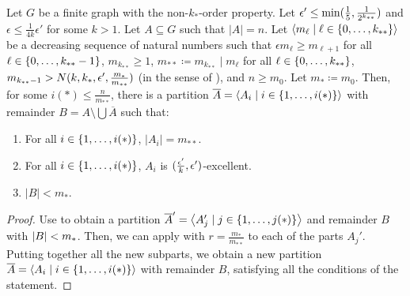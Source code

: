     \begin{lemma}[Claim 5.14.1a] \label{lem:existance_of_excellent_partition_with_equal_size}
        Let $G$ be a finite graph with the non-$k_{*}$-order property.
        Let $\epsilon' \leq \min ( \frac{1}{5}, \frac{1}{2^{k_{**}}} )$ and $\epsilon \leq \frac{1}{4k} \epsilon'$ for some $k > 1$.
        Let $A \subseteq G$ such that $|A| = n$.
        Let $\left< m_\ell \mid \ell \in \{ 0, \dots, k_{**} \} \right>$ be a decreasing sequence of natural numbers such that
        $\epsilon m_{\ell} \geq m_{\ell+1}$ for all $\ell \in \{ 0, \dots, k_{**}-1 \}$, $m_{k_{**}} \geq 1$,
        $m_{**} \coloneqq m_{k_{**}} \mid m_\ell$ for all $\ell \in \{ 0, \dots, k_{**} \}$,
        $m_{k_{**}-1} > N( k, k_*, \epsilon', \frac{m_*}{m_{**}} )$
        (in the sense of ), and $n \geq m_0$.
        Let $m_* \coloneqq m_0$.
        Then, for some $i(*) \leq \frac{n}{m_{**}}$, there is a partition $\overline{A} = \left< A_i \mid i \in \{ 1, \dots, i(*) \} \right>$
        with remainder $B = A \setminus \bigcup \overline{A}$ such that:
        \begin{enumerate}[label=(\alph*), ref=\alph*]
            \item \label{itm:existance_of_excellent_partition_with_equal_size.a} For all $i \in \{ 1, \dots, i(*) \}$, $|A_i| = m_{**}$.
            \item \label{itm:existance_of_excellent_partition_with_equal_size.c} For all $i \in \{ 1, \dots, i(*) \}$, $A_i$ is $( \frac{\epsilon'}{k}, \epsilon' )$-excellent.
            \item \label{itm:existance_of_excellent_partition_with_equal_size.d} $|B| < m_*$.
        \end{enumerate}
        \begin{proof}
            Use  to obtain a partition
            $\overline{A}' = \left< A_j' \mid j \in \{ 1, \dots, j(*) \} \right>$ and remainder $B$ with $| B | < m_*$.
            Then, we can apply  with $r = \frac{m_*}{m_{**}}$ to each of
            the parts $A_j'$.
            Putting together all the new subparts, we obtain a new partition $\overline{A} = \left< A_i \mid i \in \{ 1, \dots, i(*) \} \right>$
            with remainder $B$, satisfying all the conditions of the statement.
        \end{proof}
    \end{lemma}

